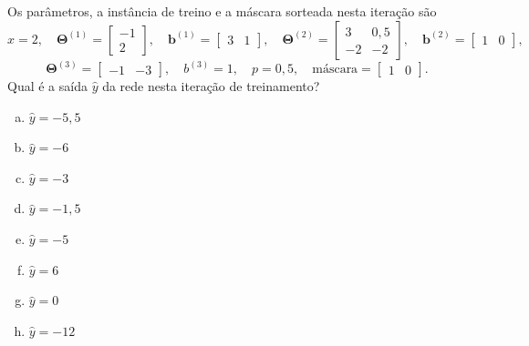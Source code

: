 \documentclass{dlproblemset}
\begin{document}
\begin{enumerate}[1)]
    Os parâmetros, a instância de treino e a máscara sorteada nesta iteração são
    \[
    x = 2, \quad
    \mathbf{\Theta}^{(1)} = \begin{bmatrix} -1 \\ 2 \end{bmatrix}, \quad
    \mathbf{b}^{(1)} = \begin{bmatrix} 3 & 1 \end{bmatrix}, \quad
    \mathbf{\Theta}^{(2)} = \begin{bmatrix} 3 & 0{,}5 \\ -2 & -2 \end{bmatrix}, \quad
    \mathbf{b}^{(2)} = \begin{bmatrix} 1 & 0 \end{bmatrix},
    \]
    \[
    \mathbf{\Theta}^{(3)} = \begin{bmatrix} -1 & -3 \end{bmatrix}, \quad
    b^{(3)} = 1, \quad
    p = 0{,}5, \quad
    \text{máscara} = \begin{bmatrix} 1 & 0 \end{bmatrix}.
    \]
    Qual é a saída $\hat{y}$ da rede nesta iteração de treinamento?

    \begin{enumerate}[(a)]
        \item $\hat{y} = -5{,}5$
        \item $\hat{y} = -6$
        \item $\hat{y} = -3$
        \item $\hat{y} = -1{,}5$
        \item $\hat{y} = -5$
        \item $\hat{y} = 6$
        \item $\hat{y} = 0$
        \item $\hat{y} = -12$
    \end{enumerate}

\end{enumerate}

\newpage
\end{document}

